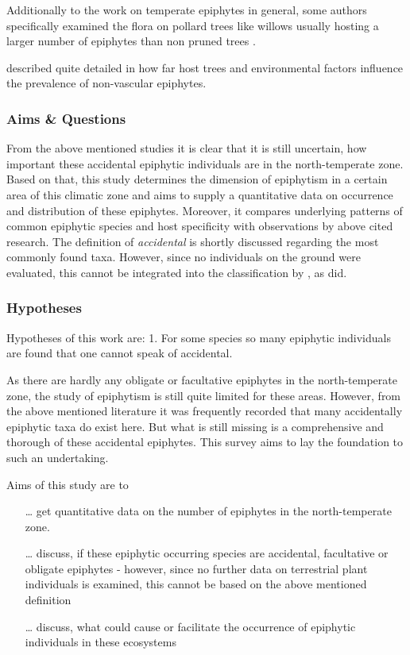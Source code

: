 \documentclass[12pt, a4paper, oneside, draft]{scrartcl}
\begin{document}
	Additionally to the work on temperate epiphytes in general, some authors specifically examined the flora on pollard trees like willows usually hosting a larger number of epiphytes than non pruned trees \parencite{Willis1893, Geisenheyner1895, Carriere1977, Bolle1891, Loew1892, Steenis1928, Steenis1925}.
	
	\textcite{Ochsner1927} described quite detailed in how far host trees and environmental factors influence the prevalence of non-vascular epiphytes. 
	
	
	
	
	\subsubsection*{Aims \& Questions}
		From the above mentioned studies it is clear that it is still uncertain, how important these accidental epiphytic individuals are in the north-temperate zone. Based on that, this study determines the dimension of epiphytism in a certain area of this climatic zone and aims to supply a quantitative data on occurrence and distribution of these epiphytes. Moreover, it compares underlying patterns of common epiphytic species and host specificity with observations by above cited research. The definition of \emph{accidental }is shortly discussed regarding the most commonly found taxa. However, since no individuals on the ground were evaluated, this cannot be integrated into the classification by \textcite{Ibisch1996}, as \textcite{Burns2010} did.
		
		\subsubsection*{Hypotheses}
		Hypotheses of this work are: 1. For some species so many epiphytic individuals are found that one cannot speak of accidental.
		
		
	
	As there are hardly any obligate or facultative epiphytes in the north-temperate zone, the study of epiphytism is still quite limited for these areas. However, from the above mentioned literature it was frequently recorded that many accidentally epiphytic taxa do exist here. But what is still missing is a comprehensive and thorough  of these accidental epiphytes. This survey aims to lay the foundation to such an undertaking.
	
	Aims of this study are to
	\begin{itemize}
		\item[…] get quantitative data on the number of epiphytes in the north-temperate zone.
		\item[…] discuss, if these epiphytic occurring species are accidental, facultative or obligate epiphytes
		\subitem - however, since no further data on terrestrial plant individuals is examined, this cannot be based on the above mentioned definition
		\item[…] discuss, what could cause or facilitate the occurrence of epiphytic individuals in these ecosystems 
	\end{itemize}
	
\end{document}

